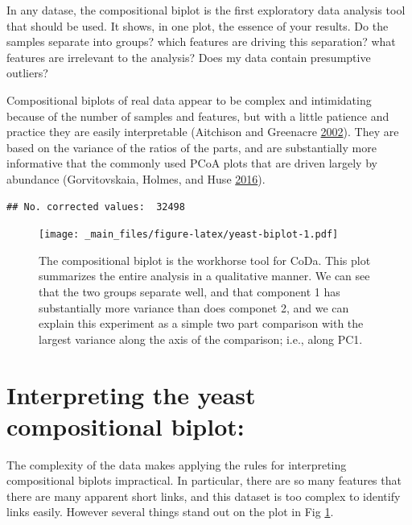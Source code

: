 \documentclass[onecolumn]{book}
\theoremstyle{definition}
\theoremstyle{definition}
\theoremstyle{definition}
\theoremstyle{remark}
\begin{document}
In any datase, the compositional biplot is the first exploratory data
analysis tool that should be used. It shows, in one plot, the essence of
your results. Do the samples separate into groups? which features are
driving this separation? what features are irrelevant to the analysis?
Does my data contain presumptive outliers?

Compositional biplots of real data appear to be complex and intimidating
because of the number of samples and features, but with a little
patience and practice they are easily interpretable (Aitchison and
Greenacre \protect\hyperlink{ref-aitchison2002biplots}{2002}). They are
based on the variance of the ratios of the parts, and are substantially
more informative that the commonly used PCoA plots that are driven
largely by abundance (Gorvitovskaia, Holmes, and Huse
\protect\hyperlink{ref-Gorvitovskaia:2016aa}{2016}).

\begin{verbatim}
## No. corrected values:  32498
\end{verbatim}

\begin{figure}
\centering
\texttt{[image: \_main\_files/figure-latex/yeast-biplot-1.pdf]}
\caption{\label{fig:yeast-biplot}The compositional biplot is the workhorse
tool for CoDa. This plot summarizes the entire analysis in a qualitative
manner. We can see that the two groups separate well, and that component
1 has substantially more variance than does componet 2, and we can
explain this experiment as a simple two part comparison with the largest
variance along the axis of the comparison; i.e., along PC1.}
\end{figure}

\hypertarget{interpreting-the-yeast-compositional-biplot}{%
\section{Interpreting the yeast compositional
biplot:}\label{interpreting-the-yeast-compositional-biplot}}

The complexity of the data makes applying the rules for interpreting
compositional biplots impractical. In particular, there are so many
features that there are many apparent short links, and this dataset is
too complex to identify links easily. However several things stand out
on the plot in Fig \ref{fig:yeast-biplot}.
\end{document}
